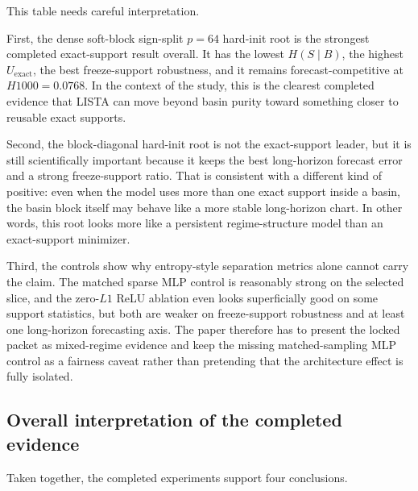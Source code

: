 \documentclass[11pt]{article}
\begin{document}
This table needs careful interpretation.

First, the dense soft-block sign-split $p=64$ hard-init root is the strongest
completed exact-support result overall. It has the lowest $H(S \mid B)$, the
highest $U_{\text{exact}}$, the best freeze-support robustness, and it remains
forecast-competitive at $H1000=0.0768$. In the context of the study, this is
the clearest completed evidence that LISTA can move beyond basin purity toward
something closer to reusable exact supports.

Second, the block-diagonal hard-init root is not the exact-support leader, but
it is still scientifically important because it keeps the best long-horizon
forecast error and a strong freeze-support ratio. That is consistent with a
different kind of positive: even when the model uses more than one exact
support inside a basin, the basin block itself may behave like a more stable
long-horizon chart. In other words, this root looks more like a persistent
regime-structure model than an exact-support minimizer.

Third, the controls show why entropy-style separation metrics alone cannot
carry the claim. The matched sparse MLP control is reasonably strong on the
selected slice, and the zero-$L1$ ReLU ablation even looks superficially good
on some support statistics, but both are weaker on freeze-support robustness
and at least one long-horizon forecasting axis. The paper therefore has to
present the locked packet as mixed-regime evidence and keep the missing
matched-sampling MLP control as a fairness caveat rather than pretending that
the architecture effect is fully isolated.

\subsection{Overall interpretation of the completed evidence}

Taken together, the completed experiments support four conclusions.
\end{document}
